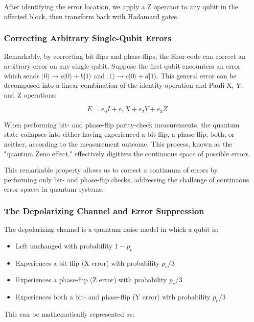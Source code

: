 \documentclass[12pt,a4paper]{article}
\begin{document}
After identifying the error location, we apply a Z operator to any qubit in the affected block, then transform back with Hadamard gates.

\subsubsection{Correcting Arbitrary Single-Qubit Errors}

Remarkably, by correcting bit-flips and phase-flips, the Shor code can correct an arbitrary error on any single qubit. Suppose the first qubit encounters an error which sends $|0\rangle \rightarrow a|0\rangle+b|1\rangle$ and $|1\rangle \rightarrow c|0\rangle+d|1\rangle$. This general error can be decomposed into a linear combination of the identity operation and Pauli X, Y, and Z operations:

\begin{equation}
E = e_0 I + e_1 X + e_2 Y + e_3 Z
\end{equation}

When performing bit- and phase-flip parity-check measurements, the quantum state collapses into either having experienced a bit-flip, a phase-flip, both, or neither, according to the measurement outcome. This process, known as the "quantum Zeno effect," effectively digitizes the continuous space of possible errors.

This remarkable property allows us to correct a continuum of errors by performing only bit- and phase-flip checks, addressing the challenge of continuous error spaces in quantum systems.

\subsubsection{The Depolarizing Channel and Error Suppression}

The depolarizing channel is a quantum noise model in which a qubit is:
\begin{itemize}
\item Left unchanged with probability $1-p_e$
\item Experiences a bit-flip (X error) with probability $p_e/3$
\item Experiences a phase-flip (Z error) with probability $p_e/3$
\item Experiences both a bit- and phase-flip (Y error) with probability $p_e/3$
\end{itemize}

This can be mathematically represented as:
\end{document}
